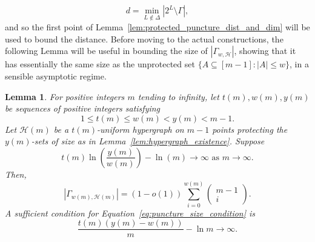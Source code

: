 \documentclass{article}
\newcounter{main}[section]
\newtheorem{lemma}[main]{Lemma}
\begin{document}
\begin{equation}
    d = \min_{L \notin \Delta}\left|2^L\setminus \Gamma\right|,
\end{equation}
and so the first point of Lemma~\ref{lem:protected_puncture_dist_and_dim} will be used to bound the distance. Before moving to the actual constructions, the following Lemma will be useful in bounding the size of $|\Gamma_{w,\mathcal{H}}|$, showing that it has essentially the same size as the unprotected set $\{A \subseteq [m-1]: |A| \leq w\}$, in a sensible asymptotic regime.
\begin{lemma}\label{lem:puncture_set_scaling}
    For positive integers $m$ tending to infinity, let $t(m), w(m), y(m)$ be sequences of positive integers satisfying
    \begin{equation}
        1 \leq t(m) \leq w(m) < y(m) < m-1.
    \end{equation}
    Let $\mathcal{H}(m)$ be a $t(m)$-uniform hypergraph on $m-1$ points protecting the $y(m)$-sets of size as in Lemma~\ref{lem:hypergraph_existence}. Suppose
    \begin{equation}\label{eq:puncture_size_condition}
        t(m)\ln\left(\frac{y(m)}{w(m)}\right) - \ln(m) \to \infty\text{ as } m \to \infty.
    \end{equation}
    Then,
    \begin{equation}
        |\Gamma_{w(m),\mathcal{H}(m)}| = (1-o(1))\sum_{i=0}^{w(m)}\begin{pmatrix}
            m-1\\i
        \end{pmatrix}.
    \end{equation}
    A sufficient condition for Equation~\eqref{eq:puncture_size_condition} is
    \begin{equation}\label{eq:puncture_size_sufficient}
        \frac{t(m)(y(m)-w(m))}{m} - \ln m \to \infty.
    \end{equation}
\end{lemma}
\end{document}
